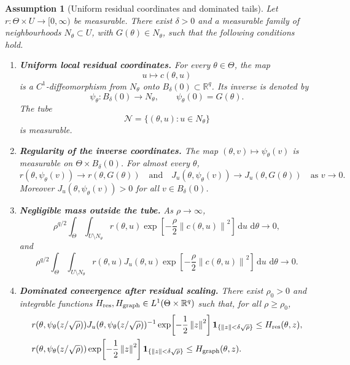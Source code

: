 \documentclass[11pt]{article}
\newtheorem{assumption}{Assumption}
\newcommand{\R}{\mathbb{R}}
\newcommand{\dd}{\,\mathrm{d}}
\newcommand{\norm}[1]{\left\lVert #1\right\rVert}
\begin{document}
\begin{assumption}[Uniform residual coordinates and dominated tails]
\label{ass:uniform_residual_coordinates}
Let \(r:\Theta\times U\to[0,\infty)\) be measurable. There exist \(\delta>0\) and a measurable family of neighbourhoods \(N_\theta\subset U\), with \(G(\theta)\in N_\theta\), such that the following conditions hold.

\begin{enumerate}[leftmargin=*]
 \item \textbf{Uniform local residual coordinates.}
 For every \(\theta\in\Theta\), the map
 \[
  u\mapsto c(\theta,u)
 \]
 is a \(C^1\)-diffeomorphism from \(N_\theta\) onto \(B_\delta(0)\subset\R^q\).
 Its inverse is denoted by
 \[
  \psi_\theta:B_\delta(0)\to N_\theta,
  \qquad
  \psi_\theta(0)=G(\theta).
 \]
 The tube
 \[
  \mathcal N=\{(\theta,u):u\in N_\theta\}
 \]
 is measurable.

 \item \textbf{Regularity of the inverse coordinates.}
 The map \((\theta,v)\mapsto \psi_\theta(v)\) is measurable on
 \(\Theta\times B_\delta(0)\). For almost every \(\theta\),
 \[
  r(\theta,\psi_\theta(v))\to r(\theta,G(\theta))
  \quad\text{and}\quad
  J_u(\theta,\psi_\theta(v))\to J_u(\theta,G(\theta))
  \quad\text{as }v\to0.
 \]
 Moreover \(J_u(\theta,\psi_\theta(v))>0\) for all \(v\in B_\delta(0)\).

 \item \textbf{Negligible mass outside the tube.}
 As \(\rho\to\infty\),
 \begin{equation}
  \rho^{q/2}
  \int_\Theta\int_{U\setminus N_\theta}
  r(\theta,u)
  \exp\!\left[-\frac{\rho}{2}\norm{c(\theta,u)}^2\right]
  \dd u\,\dd\theta
  \longrightarrow 0,
  \label{eq:assumption_tail_uncorrected}
 \end{equation}
 and
 \begin{equation}
  \rho^{q/2}
  \int_\Theta\int_{U\setminus N_\theta}
  r(\theta,u)J_u(\theta,u)
  \exp\!\left[-\frac{\rho}{2}\norm{c(\theta,u)}^2\right]
  \dd u\,\dd\theta
  \longrightarrow 0 .
  \label{eq:assumption_tail_corrected}
 \end{equation}

 \item \textbf{Dominated convergence after residual scaling.}
 There exist \(\rho_0>0\) and integrable functions
 \(H_{\rm res},H_{\rm graph}\in L^1(\Theta\times\R^q)\) such that, for all
 \(\rho\ge \rho_0\),
 \begin{align}
 &r(\theta,\psi_\theta(z/\sqrt{\rho}))
 J_u(\theta,\psi_\theta(z/\sqrt{\rho}))^{-1}
 \exp\!\left[-\frac{1}{2}\norm{z}^2\right]
 \mathbf 1_{\{\norm{z}<\delta\sqrt{\rho}\}}
 \le H_{\rm res}(\theta,z),
 \label{eq:assumption_dom_uncorrected}\\
 &r(\theta,\psi_\theta(z/\sqrt{\rho}))
 \exp\!\left[-\frac{1}{2}\norm{z}^2\right]
 \mathbf 1_{\{\norm{z}<\delta\sqrt{\rho}\}}
 \le H_{\rm graph}(\theta,z).
 \label{eq:assumption_dom_corrected}
 \end{align}


\end{enumerate}
\end{assumption}
\end{document}
